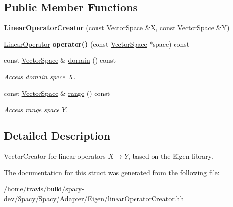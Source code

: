 \subsection*{\-Public \-Member \-Functions}
\begin{DoxyCompactItemize}
\item 
\hypertarget{structSpacy_1_1Rn_1_1LinearOperatorCreator_a7f00b9a6f0f656d756a65d42803e3620}{{\bfseries \-Linear\-Operator\-Creator} (const \hyperlink{classSpacy_1_1VectorSpace}{\-Vector\-Space} \&\-X, const \hyperlink{classSpacy_1_1VectorSpace}{\-Vector\-Space} \&\-Y)}\label{structSpacy_1_1Rn_1_1LinearOperatorCreator_a7f00b9a6f0f656d756a65d42803e3620}

\item 
\hypertarget{classSpacy_1_1Generic_1_1LinearOperatorCreator_a34e9eee442ba1bffeab9905266500bf6}{\hyperlink{classSpacy_1_1Rn_1_1LinearOperator}{\-Linear\-Operator} {\bfseries operator()} (const \hyperlink{classSpacy_1_1VectorSpace}{\-Vector\-Space} $\ast$space) const }\label{classSpacy_1_1Generic_1_1LinearOperatorCreator_a34e9eee442ba1bffeab9905266500bf6}

\item 
\hypertarget{classSpacy_1_1OperatorBase_a2588f9b3e0188820c4c494e63293dc6f}{const \hyperlink{classSpacy_1_1VectorSpace}{\-Vector\-Space} \& \hyperlink{classSpacy_1_1OperatorBase_a2588f9b3e0188820c4c494e63293dc6f}{domain} () const }\label{classSpacy_1_1OperatorBase_a2588f9b3e0188820c4c494e63293dc6f}

\begin{DoxyCompactList}\small\item\em \-Access domain space $X$. \end{DoxyCompactList}\item 
\hypertarget{classSpacy_1_1OperatorBase_ab19d3b7a6f290b1079248f1e567e53d6}{const \hyperlink{classSpacy_1_1VectorSpace}{\-Vector\-Space} \& \hyperlink{classSpacy_1_1OperatorBase_ab19d3b7a6f290b1079248f1e567e53d6}{range} () const }\label{classSpacy_1_1OperatorBase_ab19d3b7a6f290b1079248f1e567e53d6}

\begin{DoxyCompactList}\small\item\em \-Access range space $Y$. \end{DoxyCompactList}\end{DoxyCompactItemize}


\subsection{\-Detailed \-Description}
\-Vector\-Creator for linear operators $X\rightarrow Y$, based on the \-Eigen library. 

\-The documentation for this struct was generated from the following file\-:\begin{DoxyCompactItemize}
\item 
/home/travis/build/spacy-\/dev/\-Spacy/\-Spacy/\-Adapter/\-Eigen/linear\-Operator\-Creator.\-hh\end{DoxyCompactItemize}
